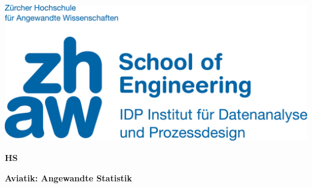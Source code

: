 \noindent
\begin{minipage}[t]{0.4\textwidth} 
\includegraphics[width=\linewidth]{logo.jpg}
\end{minipage}%
\hfill%
\begin{minipage}[t]{0.4\textwidth}\raggedleft
\textbf{\large HS \the\year}
\end{minipage}

\begin{center}
 \textbf{\large Aviatik: Angewandte Statistik} \\
 \vspace{0.3cm}
\end{center}
